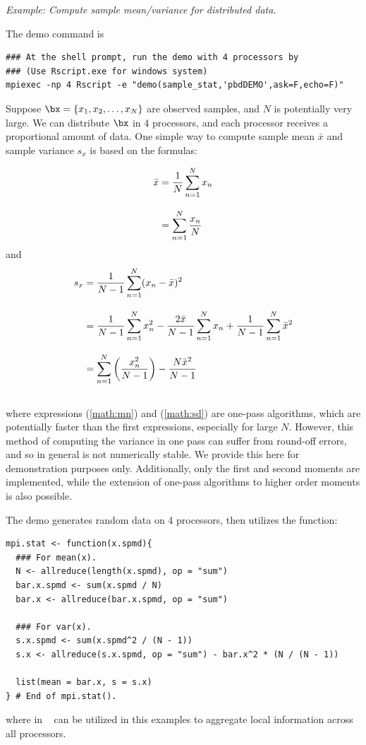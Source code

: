 \emph{Example:  Compute sample mean/variance for distributed data.}

The demo command is
\begin{lstlisting}
### At the shell prompt, run the demo with 4 processors by
### (Use Rscript.exe for windows system)
mpiexec -np 4 Rscript -e "demo(sample_stat,'pbdDEMO',ask=F,echo=F)"
\end{lstlisting}

Suppose $\bx = \{x_1, x_2, \ldots, x_N\}$
are observed samples, and $N$ is potentially very large.
We can distribute $\bx$ in 4 processors, and each processor receives a
proportional amount of data. One simple way to compute sample
mean $\bar{x}$ and
sample variance $s_x$ is based on the formulas:

\begin{align}
\bar{x} &= \frac{1}{N} \sum_{n = 1}^N x_n \notag \\[.3cm]
        &= \sum_{n = 1}^N \frac{x_n}{N} \label{math:mn}
\end{align}
and
\begin{align}
s_x     &= \frac{1}{N - 1} \sum_{n = 1}^N (x_n - \bar{x})^2 \notag \\[.3cm]
        &= \frac{1}{N - 1} \sum_{n = 1}^N x_n^2 - \frac{2\bar{x}}{N - 1}\sum_{n = 1}^N x_n +  \frac{1}{N - 1}\sum_{n = 1}^N\bar{x}^2 \notag \\[.3cm]
        &= \sum_{n = 1}^N \left(\frac{x^2_n}{N-1}\right) - \frac{N \bar{x}^2}{N-1} \label{math:sd}\\\notag
\end{align}
where expressions (\ref{math:mn}) and (\ref{math:sd}) are one-pass algorithms,
which are potentially faster than the first expressions,
especially for large $N$. However, this method of computing the variance in
one pass can suffer from round-off errors, and so in general is not
numerically stable. We provide this here for demonstration purposes only.
Additionally, only the first and second moments are implemented, while
the extension of one-pass algorithms to higher order moments is also
possible.

The demo generates random data on 4 processors, then
utilizes the  function:
\begin{lstlisting}[language=rr,title=R Code]
mpi.stat <- function(x.spmd){ 
  ### For mean(x).
  N <- allreduce(length(x.spmd), op = "sum")
  bar.x.spmd <- sum(x.spmd / N)
  bar.x <- allreduce(bar.x.spmd, op = "sum")

  ### For var(x).
  s.x.spmd <- sum(x.spmd^2 / (N - 1))
  s.x <- allreduce(s.x.spmd, op = "sum") - bar.x^2 * (N / (N - 1))

  list(mean = bar.x, s = s.x)
} # End of mpi.stat().
\end{lstlisting}
where 
in ~\citep{Chen2012pbdMPIpackage} can
be utilized in this examples to aggregate local information across
all processors.






